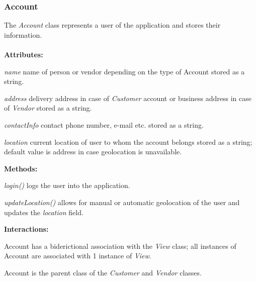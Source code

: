 \subsubsection{Account}
The \emph{Account} class represents a user of the application and stores their information. \\ \\
\noindent
\textbf{Attributes:}
\begin{description}
\item \textit{name} name of person or vendor depending on the type of Account stored as a string.
\item \textit{address} delivery address in case of \emph{Customer} account or business address in case of \emph{Vendor} stored as a string.
\item \textit{contactInfo} contact phone number, e-mail etc. stored as a string.
\item \textit{location} current location of user to whom the account belongs stored as a string; default value is address in case geolocation is unavailable.
\end{description}
\textbf{Methods:}
\begin{description}
\item \textit{login()} logs the user into the application.
\item \textit{updateLocation()} allows for manual or automatic geolocation of the user and updates the \emph{location} field.
\end{description}
\textbf{Interactions:}
\begin{description}
\item Account has a biderictional association with the \emph{View} class; all instances of Account are associated with 1 instance of \emph{View}.
\item Account is the parent class of the \emph{Customer} and \emph{Vendor} classes.
\end{description}
\vspace{.2cm}
